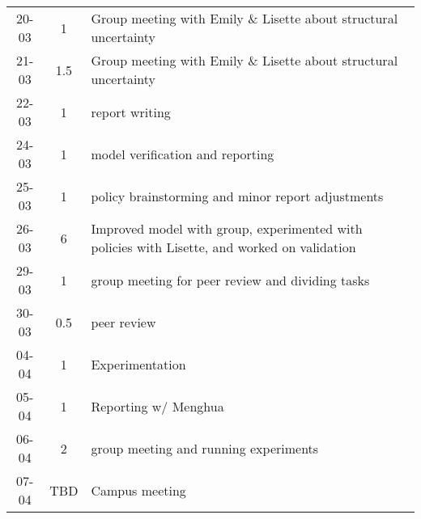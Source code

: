 \begin{longtable}[c]{c|c|m{35em}}
20-03 & 1 & Group meeting with Emily \& Lisette about structural uncertainty \\
21-03 & 1.5 & Group meeting with Emily \& Lisette about structural uncertainty \\
22-03 & 1 & report writing \\
24-03 & 1 & model verification and reporting \\
25-03 & 1 & policy brainstorming and minor report adjustments \\
26-03 & 6 & Improved model with group, experimented with policies with Lisette, and worked on validation \\
29-03 & 1 & group meeting for peer review and dividing tasks\\
30-03 & 0.5 & peer review \\
04-04 & 1 & Experimentation \\
05-04 & 1 & Reporting w/ Menghua \\
06-04 & 2 & group meeting and running experiments \\
07-04 & TBD & Campus meeting \\
\end{longtable}

